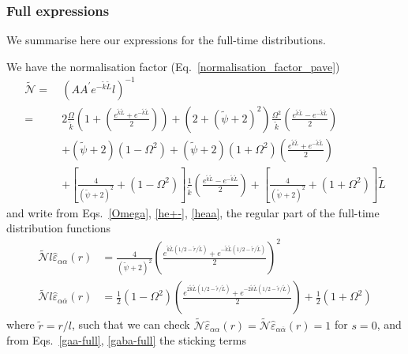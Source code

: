 \documentclass[pre,aps,superscriptaddress,nofootinbib]{revtex4}
\begin{document}
\subsubsection{Full expressions}

We summarise here our expressions for the full-time distributions.

We have the normalisation factor (Eq.~\ref{normalisation_factor_pave})
\begin{equation}
\begin{aligned}
\tilde{\mathcal{N}} =~&\left(A A^{\prime} e^{-\tilde{k}\tilde{L}} l\right)^{-1}\\
=~&2 \frac{\Omega}{\tilde{k}} \left(1 + \left(\frac{e^{\tilde{k} \tilde{L}} + e^{-\tilde{k} \tilde{L}}}{2}\right)\right) + (2 + (\tilde{\psi} + 2)^2) \frac{\Omega^2}{\tilde{k}} \left(\frac{e^{\tilde{k} \tilde{L}} - e^{-\tilde{k} \tilde{L}}}{2}\right)\\
&+ (\tilde{\psi} + 2)(1 - \Omega^2) + (\tilde{\psi} + 2)(1 + \Omega^2) \left(\frac{e^{\tilde{k} \tilde{L}} + e^{-\tilde{k} \tilde{L}}}{2}\right)\\
&+ \left[\frac{4}{(\tilde{\psi} + 2)^2} + (1 - \Omega^2)\right] \frac{1}{\tilde{k}} \left(\frac{e^{\tilde{k} \tilde{L}} - e^{-\tilde{k} \tilde{L}}}{2}\right) + \left[\frac{4}{(\tilde{\psi} + 2)^2} + (1 + \Omega^2)\right] \tilde{L}
\end{aligned}
\end{equation}
and write from Eqs.~\ref{Omega}, \ref{he+-}, \ref{heaa}, the regular part of the full-time distribution functions
\begin{align}
\tilde{\mathcal{N}} l \hat{\varepsilon}_{\alpha\alpha}(r) &= \frac{4}{(\tilde{\psi} + 2)^2} \left(\frac{e^{\tilde{k} \tilde{L} \left(1/2 - \tilde{r}/\tilde{L}\right)} + e^{-\tilde{k} \tilde{L} \left(1/2 - \tilde{r}/\tilde{L}\right)}}{2}\right)^2\\
\tilde{\mathcal{N}} l \hat{\varepsilon}_{\alpha\overline{\alpha}}(r) &= \frac{1}{2}\left(1 - \Omega^2\right) \left(\frac{e^{2 \tilde{k}\tilde{L}\left(1/2 - \tilde{r}/\tilde{L}\right)} + e^{-2 \tilde{k}\tilde{L}\left(1/2 - \tilde{r}/\tilde{L}\right)}}{2}\right) + \frac{1}{2}\left(1 + \Omega^2\right)
\end{align}
where $\tilde{r} = r/l$, such that we can check $\tilde{\mathcal{N}} \hat{\varepsilon}_{\alpha\alpha}(r) = \tilde{\mathcal{N}} \hat{\varepsilon}_{\alpha\overline{\alpha}}(r) = 1$ for $s = 0$, and from Eqs.~\ref{gaa-full}, \ref{gaba-full} the sticking terms
\end{document}
